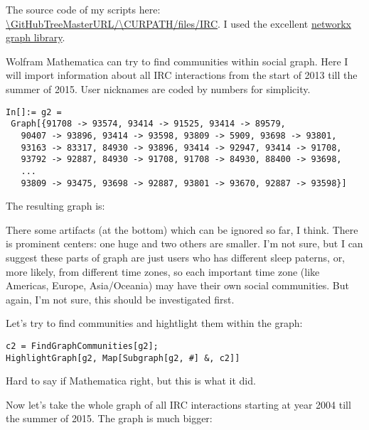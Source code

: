 The source code of my scripts here: \url{\GitHubTreeMasterURL/\CURPATH/files/IRC}.
I used the excellent \href{https://networkx.github.io/}{networkx graph library}.


Wolfram Mathematica can try to find communities within social graph.
Here I will import information about all IRC interactions from the start of 2013 till the summer of 2015.
User nicknames are coded by numbers for simplicity.

\begin{lstlisting}
In[]:= g2 = 
 Graph[{91708 -> 93574, 93414 -> 91525, 93414 -> 89579, 
   90407 -> 93896, 93414 -> 93598, 93809 -> 5909, 93698 -> 93801, 
   93163 -> 83317, 84930 -> 93896, 93414 -> 92947, 93414 -> 91708, 
   93792 -> 92887, 84930 -> 91708, 91708 -> 84930, 88400 -> 93698, 
   ...
   93809 -> 93475, 93698 -> 92887, 93801 -> 93670, 92887 -> 93598}]
\end{lstlisting}

The resulting graph is:

\begin{figure}[H]
\centering
{}
\end{figure}

There some artifacts (at the bottom) which can be ignored so far, I think.
There is prominent centers: one huge and two others are smaller.
I'm not sure, but I can suggest these parts of graph are just users who has different sleep paterns, or, more likely, from different time zones,
so each important time zone (like Americas, Europe, Asia/Oceania) may have their own social communities.
But again, I'm not sure, this should be investigated first.

Let's try to find communities and hightlight them within the graph:

\begin{lstlisting}
c2 = FindGraphCommunities[g2];
HighlightGraph[g2, Map[Subgraph[g2, #] &, c2]]
\end{lstlisting}

\begin{figure}[H]
\centering
{}
\end{figure}

Hard to say if Mathematica right, but this is what it did.

Now let's take the whole graph of all IRC interactions starting at year 2004 till the summer of 2015.
The graph is much bigger:


